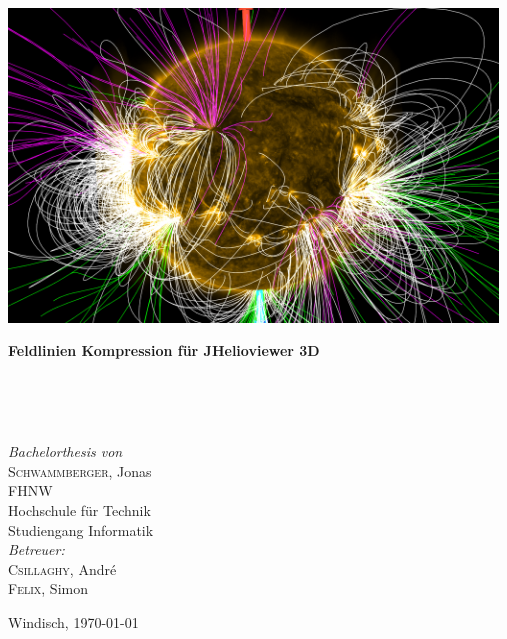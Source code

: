 
\thispagestyle{titlestyle}

\includegraphics[width=13cm]{./pictures/title.png}\vspace{0.5cm}\\

\begin{onehalfspace}
\begin{huge}
\textbf{Feldlinien Kompression für JHelioviewer 3D}
\end{huge}
\vspace{0.1cm}\\
\begin{Large}
\end{Large}
\vspace{0.8cm}\\
\begin{large}
\emph{Bachelorthesis von}\\
\textsc{Schwammberger}, Jonas\vspace{0.8cm}\\
FHNW\\
Hochschule für Technik\\
Studiengang Informatik\vspace{0.8cm}\\
\emph{Betreuer:}\\
\textsc{Csillaghy}, André\\
\textsc{Felix}, Simon\vspace{0.8cm}\\
\end{large}
\end{onehalfspace}
\vfill
\begin{normalsize}
Windisch, \today
\end{normalsize}
\pagebreak